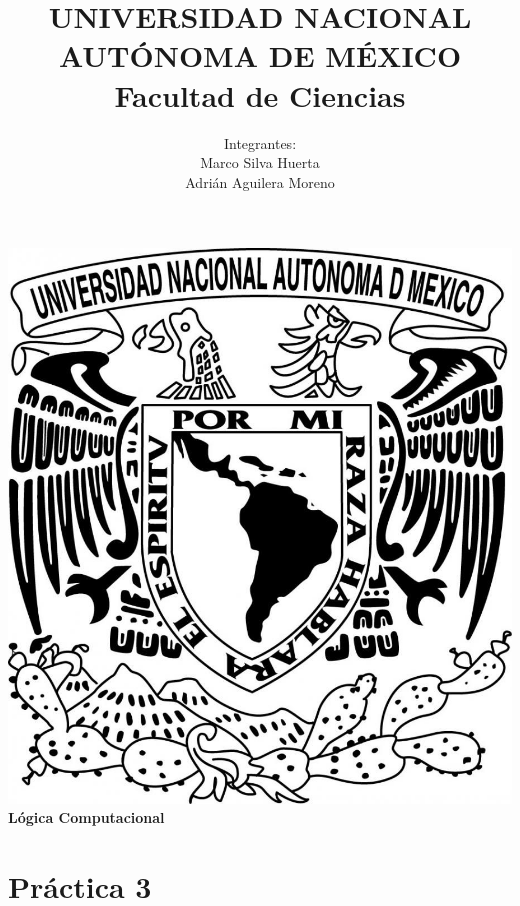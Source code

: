 \documentclass{article}
\begin{document}
\title{UNIVERSIDAD NACIONAL AUT\'ONOMA DE M\'EXICO\\ Facultad de Ciencias}
\author{Integrantes:\\
  Marco Silva Huerta\\
  Adri\'an Aguilera Moreno\\}
\date{}
\maketitle
\begin{center}
  \includegraphics[scale=0.20]{../Imagen/Portada.jpg}\\[0.4cm]
  \Large
  \bf{Lógica Computacional}
  \normalsize
\end{center}
\newpage
{}
\section*{\LARGE{Práctica 3}}
\end{document}
